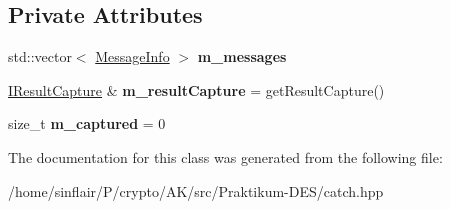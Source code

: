 \subsection*{Private Attributes}
\begin{DoxyCompactItemize}
\item 
\mbox{\label{classCatch_1_1Capturer_aefa14693d28906e5e7b06975af38aaed}} 
std\+::vector$<$ \hyperlink{structCatch_1_1MessageInfo}{Message\+Info} $>$ {\bfseries m\+\_\+messages}
\item 
\mbox{\label{classCatch_1_1Capturer_a29edecce81d56837945ba2585c0ff941}} 
\hyperlink{structCatch_1_1IResultCapture}{I\+Result\+Capture} \& {\bfseries m\+\_\+result\+Capture} = get\+Result\+Capture()
\item 
\mbox{\label{classCatch_1_1Capturer_a1c3bea0fde97a7663ece4b81187fa9ed}} 
size\+\_\+t {\bfseries m\+\_\+captured} = 0
\end{DoxyCompactItemize}


The documentation for this class was generated from the following file\+:\begin{DoxyCompactItemize}
\item 
/home/sinflair/\+P/crypto/\+A\+K/src/\+Praktikum-\/\+D\+E\+S/catch.\+hpp\end{DoxyCompactItemize}
